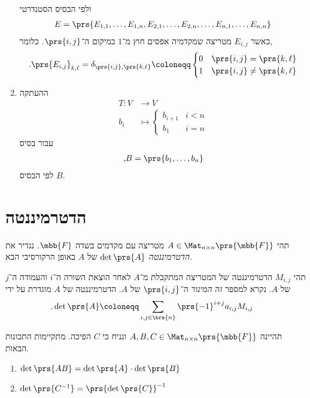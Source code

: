 \documentclass[a4paper,10pt,twoside,openany]{article}
\begin{document}
\begin{exercise}
\begin{enumerate}
ולפי הבסיס הסטנדרטי
\begin{align*}
E = \prs{E_{1,1}, \ldots, E_{1,n}, E_{2,1}, \ldots, E_{2,n}, \ldots, E_{n,1}, \ldots, E_{n,n}}
\end{align*}
כאשר
$E_{i,j}$
מטריצה שמקדמיה אפסים חוץ מ־$1$ במיקום ה־$\prs{i,j}$. כלומר,
\begin{align*}
\text{.} \prs{E_{i,j}}_{k,\ell} = \delta_{\prs{i,j}, \prs{k,\ell}} \coloneqq
\begin{cases}
0 & \prs{i,j} = \prs{k,\ell} \\
1 & \prs{i,j} \neq \prs{k,\ell}
\end{cases}
\end{align*}
\item ההעתקה
\begin{align*}
T \colon V &\to V \\
b_i &\mapsto
\begin{cases}
b_{i+1} & i < n \\
b_1 & i = n
\end{cases}
\end{align*}
עבור בסיס
\begin{align*}
\text{,} B = \prs{b_1, \ldots, b_n}
\end{align*}
לפי הבסיס
$B$.
\end{enumerate}
\end{exercise}

\section{הדטרמיננטה}

\begin{definition}[דטרמיננטה]
תהי
$A \in \Mat_{n \times n}\prs{\mbb{F}}$
מטריצה עם מקדמים בשדה
$\mbb{F}$.
נגדיר את
\emph{הדטרמיננטה}
$\det\prs{A}$
של
$A$
באופן הרקורסיבי הבא.

תהי
$M_{i,j}$
הדטרמיננטה של המטריצה המתקבלת מ־$A$ לאחר הוצאת השורה ה־$i$ והעמודה ה־$j$ של $A$.
נקרא למספר זה
\emph{המינור}
ה־$\prs{i,j}$ של
$A$.
הדטרמיננטה של
$A$
מוגדרת על ידי
\begin{align*}
\text{.} \det\prs{A} &\coloneqq \sum_{i,j \in \brs{n}} \prs{-1}^{i+j} a_{i,j} M_{i,j}
\end{align*}
\end{definition}

\begin{theorem}
תהיינה
$A, B, C \in \Mat_{n \times n}\prs{\mbb{F}}$
ונניח כי
$C$
הפיכה.
מתקיימות התכונות הבאות.
\begin{enumerate}
\item $\det\prs{AB} = \det\prs{A} \cdot \det\prs{B}$
\item $\det\prs{C^{-1}} = \prs{\det\prs{C}}^{-1}$
\end{enumerate}
\end{theorem}
\end{document}
